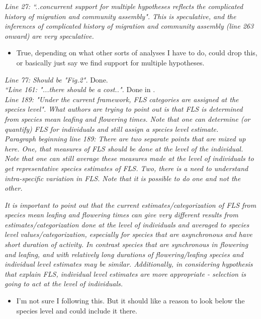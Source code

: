 \documentclass{article}[11pt]
\begin{document}
\emph{Line 27: ``..concurrent support for multiple hypotheses reflects the complicated history of migration and community assembly".  This is speculative, and the inferences of complicated history of migration and community assembly (line 263 onward) are very speculative.}
\begin{itemize}
\item True, depending on what other sorts of analyses I have to do, could drop this, or basically just say we find support for multiple hypotheses.
\end{itemize}
\emph{Line 77: Should be "Fig.2".}
Done.\\
\emph{``Line 161: "...there should be a cost..".}
Done in .\\

\emph{Line 189: "Under the current framework, FLS categories are assigned at the species level". What authors are trying to point out is that FLS is determined from species mean leafing and flowering times. Note that one can determine (or quantify) FLS for individuals and still assign a species level estimate.\\
Paragraph beginning line 189: There are two separate points that are mixed up here. One, that measures of FLS should be done at the level of the individual. Note that one can still average these measures made at the level of individuals to get representative species estimates of FLS. Two, there is a need to understand intra-specific variation in FLS. Note that it is possible to do one and not the other.}

\emph{It is important to point out that the current estimates/categorization of FLS from species mean leafing and flowering times can give very different results from estimates/categorization done at the level of individuals and averaged to species level values/categorization, especially for species that are asynchronous and have short duration of activity. In contrast species that are synchronous in flowering and leafing, and with relatively long durations of flowering/leafing species and individual level estimates may be similar. Additionally, in considering hypothesis that explain FLS, individual level estimates are more appropriate - selection is going to act at the level of individuals.}
\begin{itemize}
\item I'm not sure I following this. But it should like a reason to look below the species level and could include it there.
\end{itemize}
\end{document}
